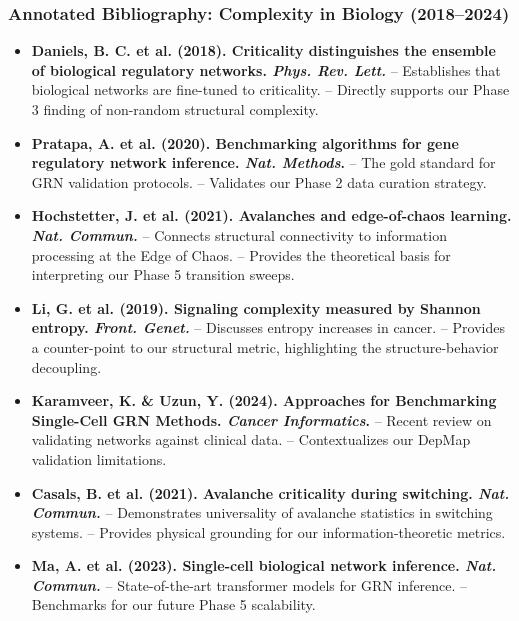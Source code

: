 \subsubsection{Annotated Bibliography: Complexity in Biology (2018--2024)}
\begin{itemize}
    \item \textbf{Daniels, B. C. et al. (2018). Criticality distinguishes the ensemble of biological regulatory networks. \textit{Phys. Rev. Lett.}} 
    -- Establishes that biological networks are fine-tuned to criticality.
    -- Directly supports our Phase 3 finding of non-random structural complexity.
    
    \item \textbf{Pratapa, A. et al. (2020). Benchmarking algorithms for gene regulatory network inference. \textit{Nat. Methods}.} 
    -- The gold standard for GRN validation protocols.
    -- Validates our Phase 2 data curation strategy.
    
    \item \textbf{Hochstetter, J. et al. (2021). Avalanches and edge-of-chaos learning. \textit{Nat. Commun.}} 
    -- Connects structural connectivity to information processing at the Edge of Chaos.
    -- Provides the theoretical basis for interpreting our Phase 5 transition sweeps.
    
    \item \textbf{Li, G. et al. (2019). Signaling complexity measured by Shannon entropy. \textit{Front. Genet.}} 
    -- Discusses entropy increases in cancer.
    -- Provides a counter-point to our structural metric, highlighting the structure-behavior decoupling.
    
    \item \textbf{Karamveer, K. \& Uzun, Y. (2024). Approaches for Benchmarking Single-Cell GRN Methods. \textit{Cancer Informatics}.} 
    -- Recent review on validating networks against clinical data.
    -- Contextualizes our DepMap validation limitations.

    \item \textbf{Casals, B. et al. (2021). Avalanche criticality during switching. \textit{Nat. Commun.}} 
    -- Demonstrates universality of avalanche statistics in switching systems.
    -- Provides physical grounding for our information-theoretic metrics.

    \item \textbf{Ma, A. et al. (2023). Single-cell biological network inference. \textit{Nat. Commun.}} 
    -- State-of-the-art transformer models for GRN inference.
    -- Benchmarks for our future Phase 5 scalability.


\end{itemize}
